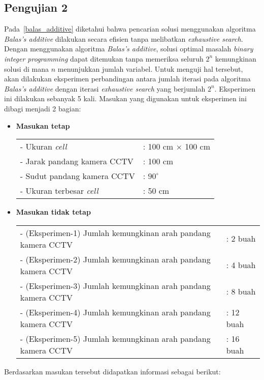 \subsection{Pengujian 2}
Pada~\ref{balas_additive} diketahui bahwa pencarian solusi menggunakan algoritma \textit{Balas's additive} dilakukan secara efisien tanpa melibatkan \textit{exhaustive search}. Dengan menggunakan algoritma \textit{Balas's additive}, solusi optimal masalah \textit{binary integer programming} dapat ditemukan tanpa memeriksa seluruh \(2^n\) kemungkinan solusi di mana \(n\) menunjukkan jumlah variabel. Untuk menguji hal tersebut, akan dilakukan eksperimen perbandingan antara jumlah iterasi pada algoritma \textit{Balas's additive} dengan iterasi \textit{exhaustive search} yang berjumlah \(2^n\). Eksperimen ini dilakukan sebanyak 5 kali. Masukan yang digunakan untuk eksperimen ini dibagi menjadi 2 bagian:
\begin{itemize}
	\item \textbf{Masukan tetap}\\
	\begin{tabular}{ll}
		- Ukuran \textit{cell} &: 100 cm $\times$ 100 cm\\
		- Jarak pandang kamera CCTV &: 100 cm\\
		- Sudut pandang kamera CCTV &: $90^\circ$\\
		- Ukuran terbesar \textit{cell} &: 50 cm\\
	\end{tabular}
	
	\item \textbf{Masukan tidak tetap}\\
	\begin{tabular}{ll}
		- (Eksperimen-1) Jumlah kemungkinan arah pandang kamera CCTV &: 2 buah\\
		- (Eksperimen-2) Jumlah kemungkinan arah pandang kamera CCTV &: 4 buah\\
		- (Eksperimen-3) Jumlah kemungkinan arah pandang kamera CCTV &: 8 buah\\
		- (Eksperimen-4) Jumlah kemungkinan arah pandang kamera CCTV &: 12 buah\\
		- (Eksperimen-5) Jumlah kemungkinan arah pandang kamera CCTV &: 16 buah\\
	\end{tabular}
\end{itemize}
Berdasarkan masukan tersebut didapatkan informasi sebagai berikut:
